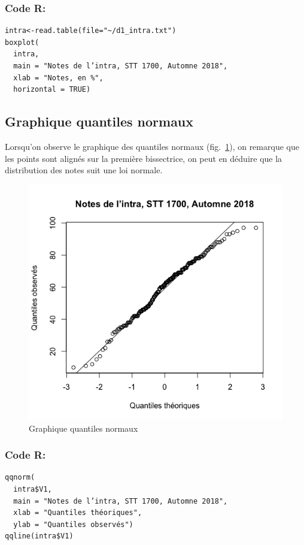 \documentclass[10pt,twocolumn]{article}
\begin{document}
\subsubsection*{Code R:}
\begin{verbatim}
intra<-read.table(file="~/d1_intra.txt")
boxplot(
  intra,
  main = "Notes de l’intra, STT 1700, Automne 2018",
  xlab = "Notes, en %",
  horizontal = TRUE)
\end{verbatim}


\subsection{Graphique quantiles normaux}
Lorsqu’on observe le graphique des quantiles normaux (fig.~\ref{intraQqnorm}), on remarque que les points sont alignés sur la première bissectrice, on peut en déduire que la distribution des notes suit une loi normale.

\begin{figure}[htbp]
	\caption{Graphique quantiles normaux}
	\label{intraQqnorm}
	\centering
	\includegraphics[width=\linewidth]{d1_intraQqnorm}
\end{figure}

\subsubsection*{Code R:}
\begin{verbatim}
qqnorm(
  intra$V1,
  main = "Notes de l’intra, STT 1700, Automne 2018",
  xlab = "Quantiles théoriques",
  ylab = "Quantiles observés")
qqline(intra$V1)
\end{verbatim}
\end{document}
